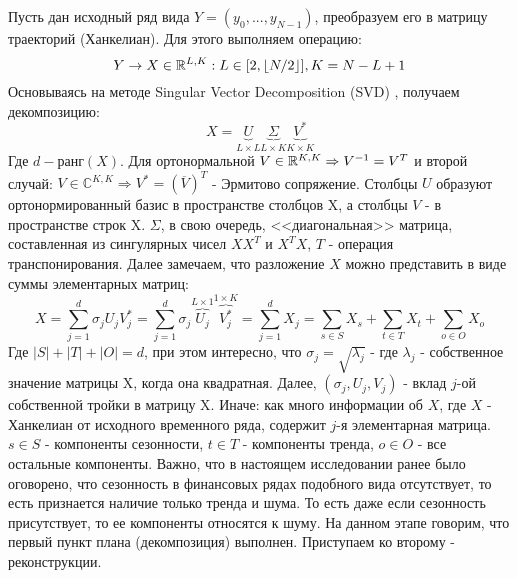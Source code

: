 Пусть дан исходный ряд вида  ${Y = (y_0, ..., y_{N - 1})}$, преобразуем его в матрицу траекторий (Ханкелиан). Для этого выполняем операцию:
\begin{equation} \label{eq::hankelisation}
	Y \rightarrow X \in \mathbb{R}^{L, K}: L \in [2, \lfloor N / 2 \rfloor], K = N - L + 1
\end{equation}
\noindent Основываясь на методе Singular Vector Decomposition (SVD) \cite{martin2012svd}, получаем декомпозицию:
\begin{equation}
	X = \underbrace{U}_{L \times L} \underbrace{\Sigma}_{L \times K} \underbrace{V^*}_{K \times K}
\end{equation}
Где ${d - \textbf{ранг}(X)}$. Для ортонормальной $V \in \mathbb{R}^{K,K} \Rightarrow V^{-1} = V^T$ и второй случай: ${V \in \mathbb{C}^{K, K} \Rightarrow V^* = \left(\overline{V}\right)^T}$ - Эрмитово сопряжение. Столбцы ${U}$ образуют ортонормированный базис в пространстве столбцов X, а столбцы ${V}$ - в пространстве строк X. ${\Sigma}$, в свою очередь, <<диагональная>> матрица, составленная из сингулярных чисел ${XX^T}$ и ${X^TX}$, $T$ - операция транспонирования. Далее замечаем, что разложение  $X$ можно представить в виде суммы элементарных матриц:
\begin{equation} \label{eq::ssa_decomposition}
	X = \sum_{j = 1}^{d} \sigma_j U_j V_j^* = \sum_{j = 1}^{d} \sigma_j \overbrace{U_j}^{L \times 1} \overbrace{V_j^*}^{1 \times K} = \sum_{j = 1}^{d} X_j = \sum_{s \in S} X_s + \sum_{t \in T} X_t + \sum_{o \in O} X_o
\end{equation}
Где $|S| + |T| + |O| = d$, при этом интересно, что $\sigma_j = \sqrt{\lambda_j}$ - где $\lambda_j$ - собственное значение матрицы X, когда она квадратная. Далее, $(\sigma_j, U_j, V_j)$ - вклад $j$-ой собственной тройки в матрицу X. Иначе: как много информации об $X$, где $X$ - Ханкелиан от исходного временного ряда, содержит $j$-я элементарная матрица. $s \in S$ - компоненты сезонности, $t \in T$ - компоненты тренда, $o \in O$ - все остальные компоненты. Важно, что в настоящем исследовании ранее было оговорено, что сезонность в финансовых рядах подобного вида отсутствует, то есть признается наличие только тренда и шума. То есть даже если сезонность присутствует, то ее компоненты относятся к шуму. На данном этапе говорим, что первый пункт плана (декомпозиция) выполнен. Приступаем ко второму - реконструкции.

